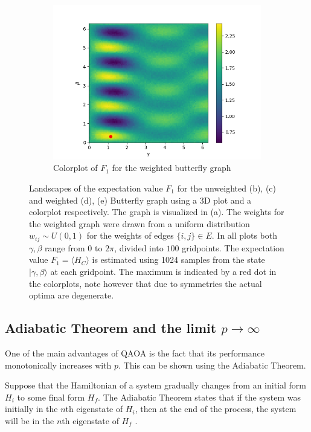 \begin{figure}[H]
\begin{subfigure}[t]{0.5\textwidth}
	\centering
	\includegraphics[width=\textwidth]{figures/landscape_new/butterfly_weighted_imshow.png}
	\caption{Colorplot of $F_1$ for the weighted butterfly graph}
	\end{subfigure}
	\caption{Landscapes of the expectation value $F_1$ for the unweighted (b), (c) and weighted (d), (e) Butterfly graph using a 3D plot and a colorplot respectively. The graph is visualized in (a). The weights for the weighted graph were drawn from a uniform distribution $w_{ij} \sim U(0,1)$ for the weights of edges $\{i,j\} \in E$. In all plots both $\gamma, \beta$ range from $0$ to $2\pi$, divided into $100$ gridpoints. The expectation value $F_1 = \langle H_C\rangle$ is estimated using 1024 samples from the state $|\gamma, \beta \rangle$ at each gridpoint. The maximum is indicated by a red dot in the colorplots, note however that due to symmetries the actual optima are degenerate.}
	\label{fig:landscapes-butterfly}
\end{figure}

\subsection{Adiabatic Theorem and the limit $p \to \infty$}
\label{subsec:adiabatic-theorem}
One of the main advantages of QAOA is the fact that its performance monotonically increases with $p$. This can be shown using the Adiabatic Theorem.
\begin{theorem}
	Suppose that the Hamiltonian of a system gradually changes from an initial form $H_i$ to some final form $H_f$. The Adiabatic Theorem states that if the system was initially in the $n$th eigenstate of $H_i$, then at the end of the process, the system will be in the $n$th eigenstate of $H_f$ \cite{Griffiths}. 
\end{theorem}

